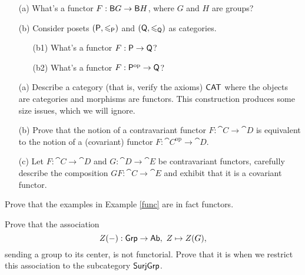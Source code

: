 \vspace{0.1in}

\begin{problem}\label{prob 2.8}\hfill
\begin{itemize}
\item[(a)] What's a functor $F: \mathsf{B}G \to \mathsf{B}H$, where $G$ and $H$ are groups?
\item[(b)] Consider posets $(\mathsf{P},\leqslant_{\mathsf{P}})$ and $(\mathsf{Q},\leqslant_{\mathsf{Q}})$ as categories. 
\begin{itemize}
\item[(b1)] What's a functor $F:\mathsf{P} \to \mathsf{Q}$?
\item[(b2)] What's a functor $F:\mathsf{P}^{\text{op}} \to \mathsf{Q}$?
\end{itemize}
\end{itemize}
\end{problem}

\vspace{0.1in}

\begin{problem}\label{prob 2.9}\hfill
\begin{itemize}
\item[(a)] Describe a category (that is, verify the axioms) $\mathsf{CAT}$ where the objects are categories and morphisms are functors. This construction produces some size issues, which we will ignore.
\item[(b)] Prove that the notion of a contravariant functor $F: \cat{C} \to \cat{D}$ is equivalent to the notion of a (covariant) functor $F:\cat{C}^{\text{op}} \to \cat{D}$.
\item[(c)] Let $F:\cat{C} \to \cat{D}$ and $G: \cat{D} \to \cat{E}$ be contravariant functors, carefully describe the composition $GF:\cat{C} \to \cat{E}$ and exhibit that it is a covariant functor.
\end{itemize}
\end{problem}

\vspace{0.1in}

\begin{problem}\label{prob 2.10}
Prove that the examples in Example \ref{func} are in fact functors.
\end{problem}

\vspace{0.1in}

\begin{problem}\label{prob 2.11}
Prove that the association \[Z(-): \mathsf{Grp} \to \mathsf{Ab},\ Z \mapsto Z(G),\]
sending a group to its center, is not functorial. Prove that it is when we restrict this association to the subcategory $\mathsf{SurjGrp}$.
\end{problem}

